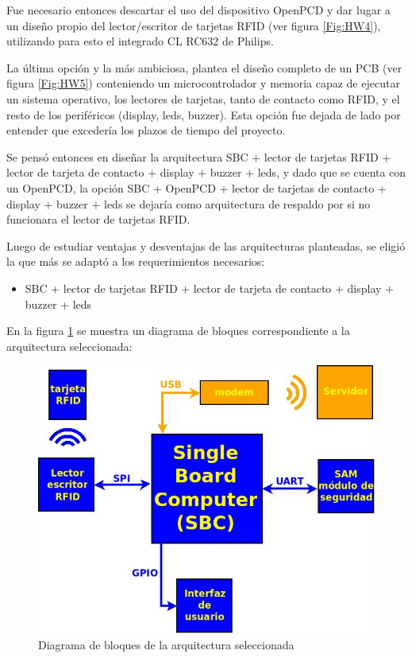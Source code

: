 Fue necesario entonces descartar el uso del dispositivo OpenPCD y dar lugar a un diseño propio del lector/escritor de tarjetas RFID (ver figura \ref{Fig:HW4}), utilizando para esto el integrado CL RC632 de Philips.

La última opción y la más ambiciosa, plantea el diseño completo de un PCB (ver figura \ref{Fig:HW5}) conteniendo un microcontrolador y memoria capaz de ejecutar un sistema operativo, los lectores de tarjetas, tanto de contacto como RFID, y el resto de los periféricos (display, leds, buzzer). Esta opción fue dejada de lado por entender que excedería los plazos de tiempo del proyecto.

Se pensó entonces en diseñar la arquitectura SBC +  lector de tarjetas RFID + lector de tarjeta de contacto + display + buzzer + leds, y dado que se cuenta con un OpenPCD, la opción SBC + OpenPCD + lector de tarjetas de contacto + display + buzzer + leds se dejaría como arquitectura de respaldo por si no funcionara el lector de tarjetas RFID.

\bigskip
Luego de estudiar ventajas y desventajas de las arquitecturas planteadas, se eligió la que más se adaptó a los requerimientos necesarios:

\begin{itemize}
\item SBC +  lector de tarjetas RFID + lector de tarjeta de contacto + display + buzzer + leds
\end{itemize}

En la figura \ref{Fig:HW_GRAL} se muestra un diagrama de bloques correspondiente a la arquitectura seleccionada:

\begin{figure}[H]
\centering
  \begin{center}
  \includegraphics[scale=.5]{Imagenes/diagrama_rf2.jpg} 
  \end{center}
  \caption{Diagrama de bloques de la arquitectura seleccionada}\label{Fig:HW_GRAL} 
\end{figure}



